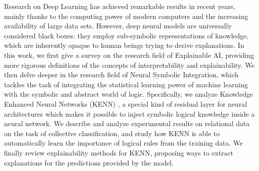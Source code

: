 
Research on Deep Learning has achieved remarkable results in recent years, mainly thanks to the computing power of modern computers and the increasing availability of large data sets. However, deep neural models are universally considered black boxes: they employ sub-symbolic representations of knowledge, which are inherently opaque to human beings trying to derive explanations. In this work, we first give a survey on the research field of Explainable AI, providing more rigorous definitions of the concepts of interpretability and explainability.
We then delve deeper in the research field of Neural Symbolic Integration, which tackles the task of integrating the statistical learning power of machine learning with the symbolic and abstract world of logic. Specifically, we analyze Knowledge Enhanced Neural Networks (KENN) \cite{daniele2019kenn}, a special kind of residual layer for neural architectures which makes it possible to inject symbolic logical knowledge inside a neural network. We describe and analyze experimental results on relational data on the task of collective classification, and study how KENN is able to automatically learn the importance of logical rules from the training data. We finally review explainability methods for KENN, proposing ways to extract explanations for the predictions provided by the model.